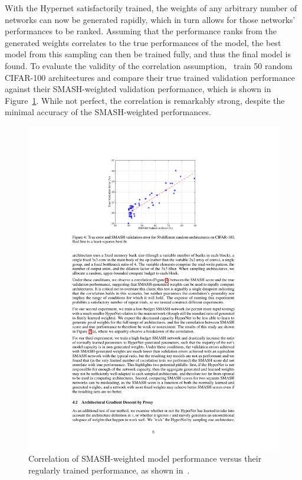 \noindent With the Hypernet satisfactorily trained, the weights of any arbitrary number of networks can now be generated rapidly,
which in turn allows for those networks' performances to be ranked. Assuming that the performance ranks from the generated
weights correlates to the true performances of the model, the best model from this sampling can then be trained fully, and
thus the final model is found. To evaluate the validity of the correlation assumption,~\citeauthor{brock2017} train 50 random
CIFAR-100 architectures and compare their true trained validation performance against their SMASH-weighted validation
performance, which is shown in Figure~\ref{fig:smash}. While not perfect, the correlation is remarkably strong, despite
the minimal accuracy of the SMASH-weighted performances.
\begin{figure}
    \center
    \includegraphics{smash}
    \caption[Correlation of SMASH-weighted models to regular training]{Correlation of SMASH-weighted model performance
    versus their regularly trained performance, as shown in~\cite{brock2017}.}
    \label{fig:smash}
\end{figure}

